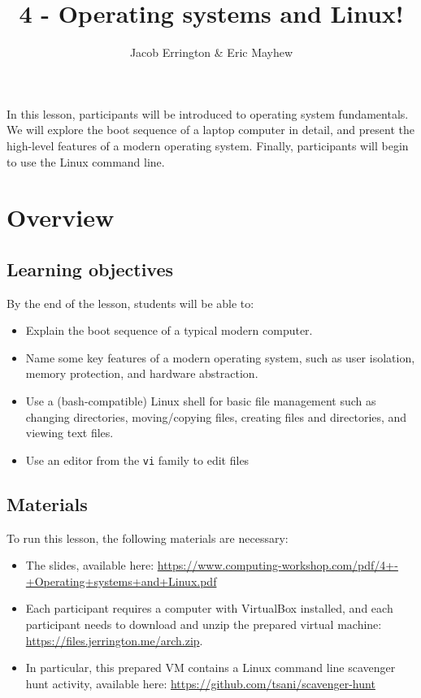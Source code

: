 \documentclass[11pt]{article}
\title{4 - Operating systems and Linux!}
\author{Jacob Errington \& Eric Mayhew}
\date{}
\newcommand{\cwurl}{https://www.computing-workshop.com/}
\newcommand{\cwpdf}{\cwurl pdf/}
\begin{document}
\maketitle

In this lesson, participants will be introduced to operating system
fundamentals. We will explore the boot sequence of a laptop computer in detail,
and present the high-level features of a modern operating system.
Finally, participants will begin to use the Linux command line.

\section*{Overview}

\subsection*{Learning objectives}

By the end of the lesson, students will be able to:
\begin{itemize}
\item
  Explain the boot sequence of a typical modern computer.
\item
  Name some key features of a modern operating system, such as user isolation,
  memory protection, and hardware abstraction.
\item
  Use a (bash-compatible) Linux shell for basic file management such as changing
  directories, moving/copying files, creating files and directories, and viewing
  text files.
\item
  Use an editor from the \texttt{vi} family to edit files
\end{itemize}

\subsection*{Materials}

To run this lesson, the following materials are necessary:

\begin{itemize}
\item
  The slides, available here:
  \url{\cwpdf 4+-+Operating+systems+and+Linux.pdf}
\item
  Each participant requires a computer with VirtualBox installed, and each
  participant needs to download and unzip the prepared virtual machine:
  \url{https://files.jerrington.me/arch.zip}.

\item
  In particular, this prepared VM contains a Linux command line scavenger hunt
  activity, available here:
  \url{https://github.com/tsani/scavenger-hunt}
\end{itemize}
\end{document}
